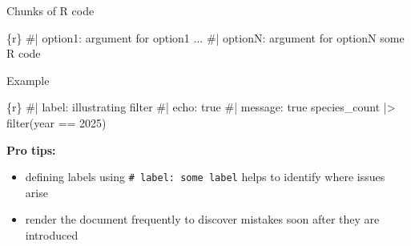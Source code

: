 \documentclass[
  ignorenonframetext,
  aspectratio=169,
  t]{beamer}
\newenvironment{Shaded}{\begin{snugshade}}{\end{snugshade}}
\newcommand{\CommentTok}[1]{\textcolor[rgb]{0.37,0.37,0.37}{#1}}
\newcommand{\DecValTok}[1]{\textcolor[rgb]{0.68,0.00,0.00}{#1}}
\newcommand{\FunctionTok}[1]{\textcolor[rgb]{0.28,0.35,0.67}{#1}}
\newcommand{\InformationTok}[1]{\textcolor[rgb]{0.37,0.37,0.37}{#1}}
\newcommand{\NormalTok}[1]{\textcolor[rgb]{0.00,0.23,0.31}{#1}}
\newcommand{\SpecialCharTok}[1]{\textcolor[rgb]{0.37,0.37,0.37}{#1}}
\providecommand{\tightlist}{%
  \setlength{\itemsep}{0pt}\setlength{\parskip}{0pt}}
\let\oldtexttt\texttt
\renewcommand{\texttt}[1]{\colorbox{gray!20}{\oldtexttt{#1}}}
\begin{document}
\begin{frame}[fragile]{Chunks of R code}
\protect{}\label{chunks-of-r-code}
\begingroup\footnotesize

\begin{Shaded}
\begin{Highlighting}[]
\InformationTok{\textasciigrave{}\textasciigrave{}\textasciigrave{}\{r\}}
\CommentTok{\#| option1: argument for option1}
\NormalTok{...}
\CommentTok{\#| optionN: argument for optionN}
\NormalTok{some R code}
\InformationTok{\textasciigrave{}\textasciigrave{}\textasciigrave{}}
\end{Highlighting}
\end{Shaded}

\endgroup

\begin{block}{Example}
\protect{}\label{example}
\begingroup\footnotesize

\begin{Shaded}
\begin{Highlighting}[]
\InformationTok{\textasciigrave{}\textasciigrave{}\textasciigrave{}\{r\}}
\CommentTok{\#| label: illustrating filter}
\CommentTok{\#| echo: true}
\CommentTok{\#| message: true}
\NormalTok{species\_count }\SpecialCharTok{|\textgreater{}} \FunctionTok{filter}\NormalTok{(year }\SpecialCharTok{==} \DecValTok{2025}\NormalTok{)}
\InformationTok{\textasciigrave{}\textasciigrave{}\textasciigrave{}}
\end{Highlighting}
\end{Shaded}

\endgroup

\pause

\textbf{Pro tips:}

\begin{itemize}
\tightlist
\item
  defining labels using \texttt{\#\textbar{}\ label:\ some\ label} helps
  to identify where issues arise
\item
  render the document frequently to discover mistakes soon after they
  are introduced
\end{itemize}
\end{block}
\end{frame}
\end{document}
